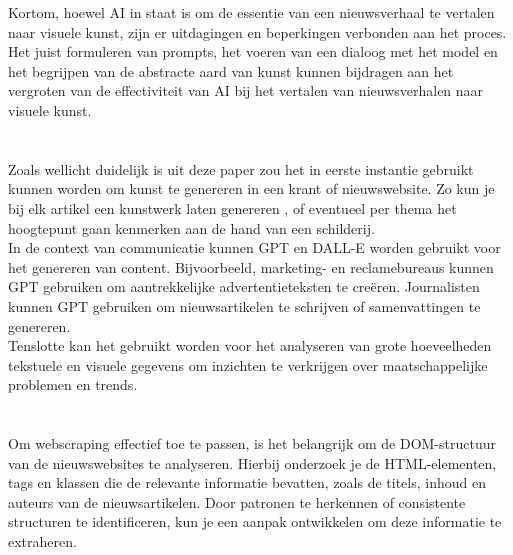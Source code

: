 Kortom, hoewel AI in staat is om de essentie van een nieuwsverhaal te vertalen naar visuele kunst, zijn er uitdagingen en beperkingen verbonden aan het proces. Het juist formuleren van prompts, het voeren van een dialoog met het model en het begrijpen van de abstracte aard van kunst kunnen bijdragen aan het vergroten van de effectiviteit van AI bij het vertalen van nieuwsverhalen naar visuele kunst.
    
\section{}%

Zoals wellicht duidelijk is uit deze paper zou het in eerste instantie gebruikt kunnen worden om kunst te genereren in een krant of nieuwswebsite. Zo kun je bij elk artikel een kunstwerk laten genereren , of eventueel per thema het hoogtepunt gaan kenmerken aan de hand van een schilderij.   \\

In de context van communicatie kunnen GPT en DALL-E worden gebruikt voor het genereren van content. Bijvoorbeeld, marketing- en reclamebureaus kunnen GPT gebruiken om aantrekkelijke advertentieteksten te creëren. Journalisten kunnen GPT gebruiken om nieuwsartikelen te schrijven of samenvattingen te genereren. \\

Tenslotte kan het gebruikt worden voor het analyseren van grote hoeveelheden tekstuele en visuele gegevens om inzichten te verkrijgen over maatschappelijke problemen en trends.


\section{  }%
Om webscraping effectief toe te passen, is het belangrijk om de DOM-structuur van de nieuwswebsites te analyseren. Hierbij onderzoek je de HTML-elementen, tags en klassen die de relevante informatie bevatten, zoals de titels, inhoud en auteurs van de nieuwsartikelen. Door patronen te herkennen of consistente structuren te identificeren, kun je een aanpak ontwikkelen om deze informatie te extraheren. \\

